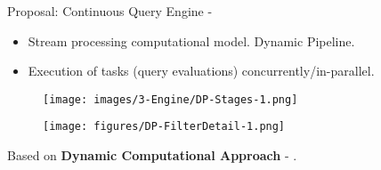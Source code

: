 \begin{frame}{Proposal: Continuous Query Engine - \DPATM}
\begin{itemize}
    \item Stream processing computational model. Dynamic Pipeline.
    \item Execution of tasks ({\small query evaluations}) concurrently/in-parallel.
\end{itemize}

\begin{figure}
    \hspace{-5.7cm}
    \centering
    \texttt{[image: images/3-Engine/DP-Stages-1.png]}
\end{figure}
\begin{figure}
    \centering
    \texttt{[image: figures/DP-FilterDetail-1.png]}
\end{figure}


Based on \textbf{Dynamic Computational Approach} - {\footnotesize \cite{Pasarella2024}}. 


\end{frame}

\begin{comment}
 Royo-Sales \cite{DP-bitriangles2021}
\end{comment}


